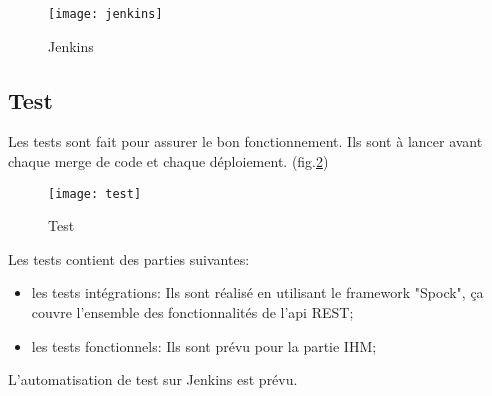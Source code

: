 \begin{figure}[ht]
 \centering
 \texttt{[image: jenkins]}
 \caption{Jenkins}
 \label{fig:jenkins}
\end{figure}

\subsection{Test}

Les tests sont fait pour assurer le bon fonctionnement.
Ils sont à lancer avant chaque merge de code et chaque déploiement. (fig.\ref{fig:test})

\begin{figure}[ht]
 \centering
 \texttt{[image: test]}
 \caption{Test}
 \label{fig:test}
\end{figure}

Les tests contient des parties suivantes:
\begin{itemize}
 \item les tests intégrations: Ils sont réalisé en utilisant le framework "Spock",
       ça couvre l'ensemble des fonctionnalités de l'api REST;
 \item les tests fonctionnels: Ils sont prévu pour la partie IHM;
\end{itemize}

L'automatisation de test sur Jenkins est prévu.

\clearpage

\clearpage
